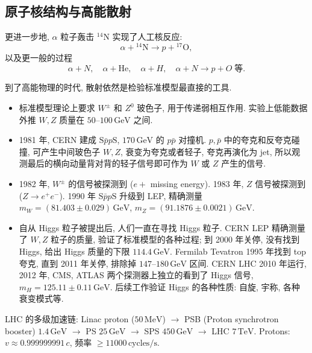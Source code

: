 \subsection{原子核结构与高能散射}

更进一步地, $\alpha$ 粒子轰击 $^{14}\mathrm{N}$ 实现了人工核反应:
\begin{equation}
\alpha+{}^{14}\mathrm{N}\to p+{}^{17}\mathrm{O},
\end{equation}
以及更一般的过程
\begin{equation}
\alpha+N,\quad \alpha+\mathrm{He},\quad \alpha+H,\quad \alpha+N\to p+O \;\text{等}.
\end{equation}

到了高能物理的时代, 散射依然是检验标准模型最直接的工具.
\begin{itemize}
    \item 标准模型理论上要求 $W^{\pm}$ 和 $Z^{0}$ 玻色子, 用于传递弱相互作用. 实验上低能数据外推 $W,Z$ 质量在 $50$--$100\,\mathrm{GeV}$ 之间.
    \item 1981 年, CERN 建成 $\mathrm{S}\bar{p}p\mathrm{S}$, $170\,\mathrm{GeV}$ 的 $p\bar p$ 对撞机. $p,\bar p$ 中的夸克和反夸克碰撞, 可产生中间玻色子 $W,Z$, 衰变为夸克或者轻子, 夸克再演化为 jet, 所以观测最后的横向动量背对背的轻子信号即可作为 $W$ 或 $Z$ 产生的信号.
    \item 1982 年, $W^{\pm}$ 的信号被探测到 ($e+$ missing energy). 1983 年, $Z$ 信号被探测到 ($Z\to e^{+}e^{-}$). 1990 年 $\mathrm{S}\bar p p\mathrm{S}$ 升级到 LEP, 精确测量 $m_W=(81.403\pm 0.029)\,\mathrm{GeV}$, $m_Z=(91.1876\pm 0.0021)\,\mathrm{GeV}$.
    \item 自从 Higgs 粒子被提出后, 人们一直在寻找 Higgs 粒子. CERN LEP 精确测量了 $W,Z$ 粒子的质量, 验证了标准模型的各种过程; 到 2000 年关停, 没有找到 Higgs, 给出 Higgs 质量的下限 $114.4\,\mathrm{GeV}$. Fermilab Tevatron 1995 年找到 top 夸克, 直到 2011 年关停, 排除掉 $147$--$180\,\mathrm{GeV}$ 区间. CERN LHC 2010 年运行, 2012 年, CMS, ATLAS 两个探测器上独立的看到了 Higgs 信号, $m_H=125.11\pm 0.11\,\mathrm{GeV}$. 后续工作验证 Higgs 的各种性质: 自旋, 宇称, 各种衰变模式等.
\end{itemize}

\begin{remark}
LHC 的多级加速链: Linac proton ($50\,\mathrm{MeV}$) $\to$ PSB (Proton synchrotron booster) $1.4\,\mathrm{GeV}$ $\to$ PS $25\,\mathrm{GeV}$ $\to$ SPS $450\,\mathrm{GeV}$ $\to$ LHC $7\,\mathrm{TeV}$. Protons: $v\approx 0.999999991\,c$, 频率 $\geq 11000\,\mathrm{cycles/s}$.
\end{remark}

